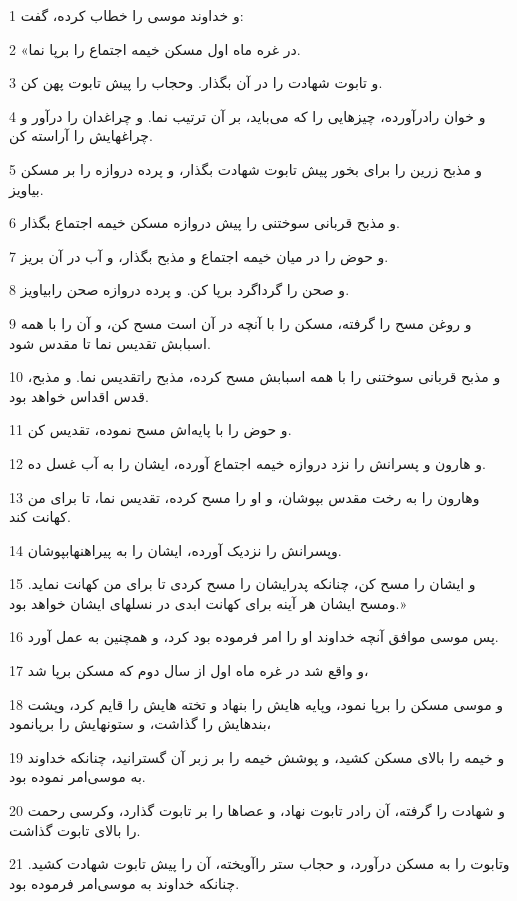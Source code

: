 \par 1 و خداوند موسی را خطاب کرده، گفت:
\par 2 «در غره ماه اول مسکن خیمه اجتماع را برپا نما.
\par 3 و تابوت شهادت را در آن بگذار. وحجاب را پیش تابوت پهن کن.
\par 4 و خوان رادرآورده، چیزهایی را که می‌باید، بر آن ترتیب نما. و چراغدان را درآور و چراغهایش را آراسته کن.
\par 5 و مذبح زرین را برای بخور پیش تابوت شهادت بگذار، و پرده دروازه را بر مسکن بیاویز.
\par 6 و مذبح قربانی سوختنی را پیش دروازه مسکن خیمه اجتماع بگذار.
\par 7 و حوض را در میان خیمه اجتماع و مذبح بگذار، و آب در آن بریز.
\par 8 و صحن را گرداگرد برپا کن. و پرده دروازه صحن رابیاویز.
\par 9 و روغن مسح را گرفته، مسکن را با آنچه در آن است مسح کن، و آن را با همه اسبابش تقدیس نما تا مقدس شود.
\par 10 و مذبح قربانی سوختنی را با همه اسبابش مسح کرده، مذبح راتقدیس نما. و مذبح، قدس اقداس خواهد بود.
\par 11 و حوض را با پایه‌اش مسح نموده، تقدیس کن.
\par 12 و هارون و پسرانش را نزد دروازه خیمه اجتماع آورده، ایشان را به آب غسل ده.
\par 13 وهارون را به رخت مقدس بپوشان، و او را مسح کرده، تقدیس نما، تا برای من کهانت کند.
\par 14 وپسرانش را نزدیک آورده، ایشان را به پیراهنهابپوشان.
\par 15 و ایشان را مسح کن، چنانکه پدرایشان را مسح کردی تا برای من کهانت نماید. ومسح ایشان هر آینه برای کهانت ابدی در نسلهای ایشان خواهد بود.»
\par 16 پس موسی موافق آنچه خداوند او را امر فرموده بود کرد، و همچنین به عمل آورد.
\par 17 و واقع شد در غره ماه اول از سال دوم که مسکن برپا شد،
\par 18 و موسی مسکن را برپا نمود، وپایه هایش را بنهاد و تخته هایش را قایم کرد، وپشت بندهایش را گذاشت، و ستونهایش را برپانمود،
\par 19 و خیمه را بالای مسکن کشید، و پوشش خیمه را بر زبر آن گسترانید، چنانکه خداوند به موسی‌امر نموده بود.
\par 20 و شهادت را گرفته، آن رادر تابوت نهاد، و عصاها را بر تابوت گذارد، وکرسی رحمت را بالای تابوت گذاشت.
\par 21 وتابوت را به مسکن درآورد، و حجاب ستر راآویخته، آن را پیش تابوت شهادت کشید. چنانکه خداوند به موسی‌امر فرموده بود.
